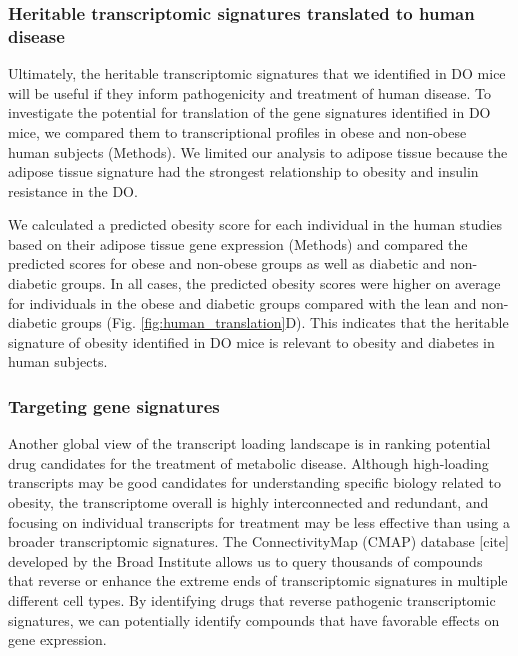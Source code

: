\documentclass[
]{article}
\begin{document}
\subsubsection{Heritable transcriptomic signatures translated to human
disease}\label{heritable-transcriptomic-signatures-translated-to-human-disease}

Ultimately, the heritable transcriptomic signatures that we identified
in DO mice will be useful if they inform pathogenicity and treatment of
human disease. To investigate the potential for translation of the gene
signatures identified in DO mice, we compared them to transcriptional
profiles in obese and non-obese human subjects (Methods). We limited our
analysis to adipose tissue because the adipose tissue signature had the
strongest relationship to obesity and insulin resistance in the DO.

We calculated a predicted obesity score for each individual in the human
studies based on their adipose tissue gene expression (Methods) and
compared the predicted scores for obese and non-obese groups as well as
diabetic and non-diabetic groups. In all cases, the predicted obesity
scores were higher on average for individuals in the obese and diabetic
groups compared with the lean and non-diabetic groups (Fig.
\ref{fig:human_translation}D). This indicates that the heritable
signature of obesity identified in DO mice is relevant to obesity and
diabetes in human subjects.

\subsubsection{Targeting gene
signatures}\label{targeting-gene-signatures}

Another global view of the transcript loading landscape is in ranking
potential drug candidates for the treatment of metabolic disease.
Although high-loading transcripts may be good candidates for
understanding specific biology related to obesity, the transcriptome
overall is highly interconnected and redundant, and focusing on
individual transcripts for treatment may be less effective than using a
broader transcriptomic signatures. The ConnectivityMap (CMAP) database
{[}cite{]} developed by the Broad Institute allows us to query thousands
of compounds that reverse or enhance the extreme ends of transcriptomic
signatures in multiple different cell types. By identifying drugs that
reverse pathogenic transcriptomic signatures, we can potentially
identify compounds that have favorable effects on gene expression.
\end{document}
